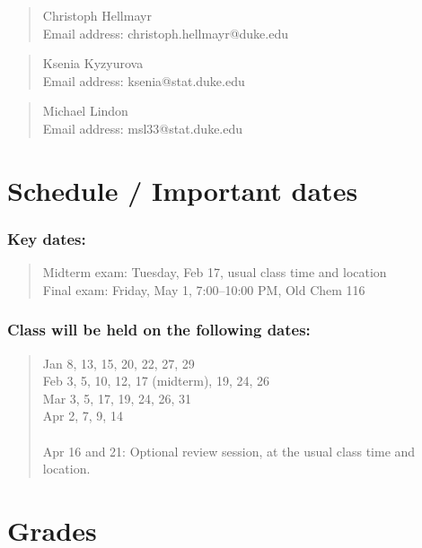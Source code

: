 \documentclass[12pt]{article}
\begin{document}
\begin{quote}
Christoph Hellmayr \\
Email address: christoph.hellmayr@duke.edu
\end{quote}

\begin{quote}
Ksenia Kyzyurova \\
Email address: ksenia@stat.duke.edu
\end{quote}

\begin{quote}
Michael Lindon \\
Email address: msl33@stat.duke.edu
\end{quote}


\section{Schedule / Important dates}

\subsubsection*{Key dates:}
\begin{quote}
Midterm exam: Tuesday, Feb 17, usual class time and location \\
Final exam: Friday, May 1, 7:00--10:00 PM, Old Chem 116
\end{quote}

\subsubsection*{Class will be held on the following dates:}
\begin{quote}
Jan 8, 13, 15, 20, 22, 27, 29 \\
Feb 3, 5, 10, 12, 17 (midterm), 19, 24, 26 \\
Mar 3, 5, 17, 19, 24, 26, 31 \\
Apr 2, 7, 9, 14\\
~\\
Apr 16 and 21: Optional review session, at the usual class time and location.
\end{quote}


\section{Grades}
\end{document}
